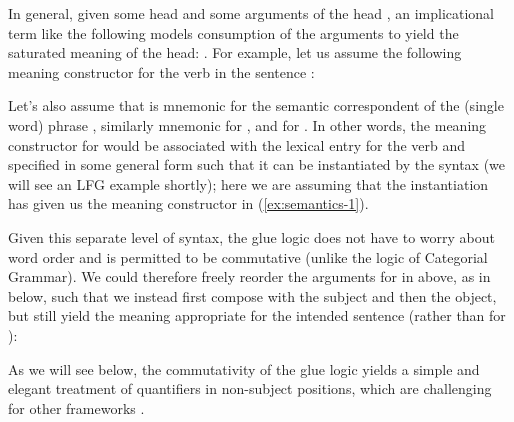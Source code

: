 In general, given some head  and some arguments of the head
, an implicational term like the following
models consumption of the arguments to yield the saturated meaning of
the head: . For
example, let us assume the following meaning constructor for the verb
 in the sentence :
%
\begin{exe}
  
\ex \label{ex:semantics-1} 
\end{exe}
%
Let's also assume that  is mnemonic for the semantic
correspondent of the (single word) phrase , 
similarly mnemonic for , and  for
. In other words, the meaning constructor for 
would be associated with the lexical entry for the verb and specified
in some general form such that it can be instantiated by the syntax
(we will see an LFG example shortly); here we are assuming that the
instantiation has given us the meaning constructor in
(\ref{ex:semantics-1}).

Given this separate level of syntax, the glue logic does not
have to worry about word order and is permitted to be commutative
(unlike the logic of Categorial Grammar). We could therefore freely
reorder the arguments for  in  above, as in  below, such that we instead
first compose with the subject and then the object, but still yield
the meaning appropriate for the intended sentence 
(rather than for ):
%
\begin{exe}
  
\ex \label{ex:semantics-2}
\end{exe}
%
As we will see below, the commutativity of the glue logic yields a
simple and elegant treatment of quantifiers in non-subject positions,
which are challenging for other frameworks \citep[see, for example, the
careful pedagogical presentation of the issue
in][244--263]{jacobson14}. 

